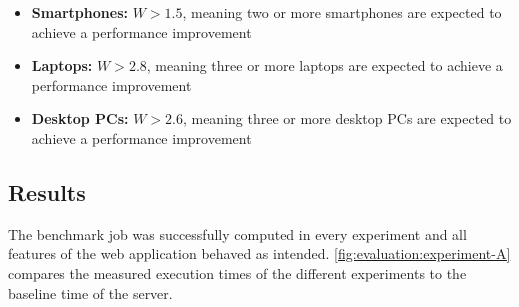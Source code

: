 \begin{itemize}
    \item \textbf{Smartphones:} $W > 1.5$, meaning two or more smartphones are expected to achieve a performance improvement 
    \item \textbf{Laptops:} $W > 2.8$, meaning three or more laptops are expected to achieve a performance improvement
    \item \textbf{Desktop \ac{PC}s:} $W > 2.6$, meaning three or more desktop \ac{PC}s are expected to achieve a performance improvement
\end{itemize}

\subsection{Results}
The benchmark job was successfully computed in every experiment and all features of the web application behaved as intended. \autoref{fig:evaluation:experiment-A} compares the measured execution times of the different experiments to the baseline time of the server.

